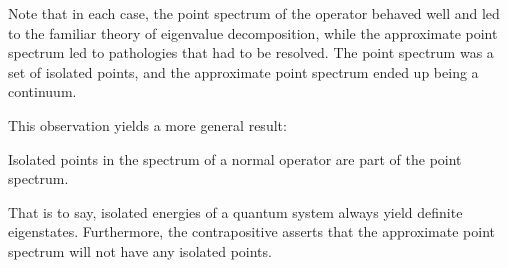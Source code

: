 Note that in each case, the point spectrum of the operator behaved well and led
to the familiar theory of eigenvalue decomposition, while the approximate point
spectrum led to pathologies that had to be resolved. The point spectrum was a
set of isolated points, and the approximate point spectrum ended up being a
continuum.

This observation yields a more general result:
\begin{theorem}
    Isolated points in the spectrum of a normal operator are part of the point
    spectrum.
\end{theorem}

That is to say, isolated energies of a quantum system always yield definite
eigenstates. Furthermore, the contrapositive asserts that the approximate point
spectrum will not have any isolated points.

